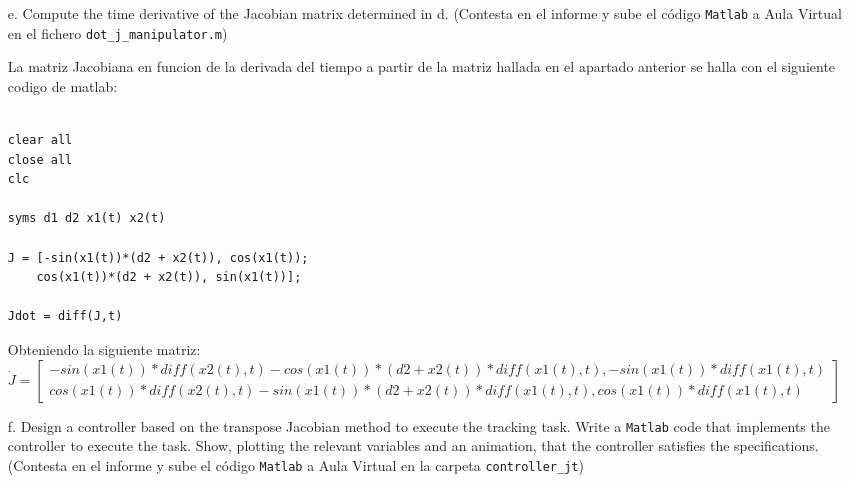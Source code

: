 \documentclass{article}
\begin{document}
\begin{itemize}
\item[e.] 
{\color{gray}
Compute the time derivative of the Jacobian matrix determined in d. (Contesta en el informe y sube el c\'odigo \texttt{Matlab} a Aula Virtual en el fichero \texttt{dot\_j\_manipulator.m})
}

\bigskip
La matriz Jacobiana en funcion de la derivada del tiempo a partir de la matriz hallada en el apartado anterior se halla con el siguiente codigo de matlab:
\bigskip


\begin{tcolorbox}
[
title={File \texttt{dot\_j\_manipulator.m}}      
]
\begin{scriptsize}
\begin{verbatim}

clear all
close all
clc

syms d1 d2 x1(t) x2(t)

J = [-sin(x1(t))*(d2 + x2(t)), cos(x1(t));
    cos(x1(t))*(d2 + x2(t)), sin(x1(t))];

Jdot = diff(J,t)

\end{verbatim}
\end{scriptsize}
\end{tcolorbox}


Obteniendo la siguiente matriz:\\

$\dot{J} =

\begin{equation}
\begin{bmatrix}
-sin(x1(t))*diff(x2(t), t) - cos(x1(t))*(d2 + x2(t))*diff(x1(t), t), -sin(x1(t))*diff(x1(t), t)\\
cos(x1(t))*diff(x2(t), t) - sin(x1(t))*(d2 + x2(t))*diff(x1(t), t),  cos(x1(t))*diff(x1(t), t)
\end{bmatrix}
\end{equation}$












\item[f.]  
{\color{gray}
Design a controller based on the transpose Jacobian method to execute the tracking task. Write a \texttt{Matlab} code that implements the controller to execute the task. Show, plotting the relevant variables and an animation, that the controller satisfies the specifications. (Contesta en el informe y sube el c\'odigo \texttt{Matlab} a Aula Virtual en la carpeta \texttt{controller\_jt})
}



\end{itemize}
\end{document}
